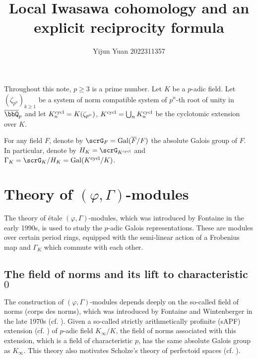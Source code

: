 \documentclass[a4paper,oneside]{amsart}
\title{Local Iwasawa cohomology and an explicit reciprocity formula}
\author{Yijun Yuan\textsuperscript{\orcidlink{0000-0001-6571-6980}} 2022311357}
\numberwithin{equation}{section}
\numberwithin{figure}{section}
\begin{document}
\maketitle
\tableofcontents
Throughout this note, $p\geq 3$ is a prime number. Let $K$ be a $p$-adic field. Let $(\zeta_{p^n})_{k\geq 1}$ be a system of norm compatible system of $p^n$-th root of unity in $\overline{\bbQ}_p$ and let $K_n^{\operatorname{cycl}}=K(\zeta_{p^n})$, $K^{\operatorname{cycl}}=\bigcup_n K_n^{\operatorname{cycl}}$ be the cyclotomic extension over $K$.

For any field $F$, denote by $\scrG_F=\opn{Gal}(\overline{F}/F)$ the absolute Galois group of $F$. In particular, denote by $H_K=\scrG_{K^{\opn{cycl}}}$ and $\Gamma_K=\scrG_K/H_K=\opn{Gal}(K^{\opn{cycl}}/K)$.
\section{Theory of $(\varphi,\Gamma)$-modules}
The theory of \'etale $(\varphi,\Gamma)$-modules, which was introduced by Fontaine in the early 1990s, is used to study the $p$-adic Galois representations. These are modules over certain period rings, equipped with the semi-linear action of a Frobenius map and $\Gamma_K$ which commute with each other.

\subsection{The field of norms and its lift to characteristic $0$}
The construction of $(\varphi,\Gamma)$-modules depends deeply on the so-called field of norms (corps des norms), which was introduced by Fontaine and Wintenberger in the late 1970s (cf. \cite{fontaine_extensions_1979,fontaine_corps_1979,wintenberger_corps_1983}). Given a so-called strictly arithmetically profinite (sAPF) extension (cf. \cite[D\'efinitions 1.2.1]{wintenberger_corps_1983}) of $p$-adic field $K_\infty/K$, the field of norms associated with this extension, which is a field of characteristic $p$, has the same absolute Galois group as $K_\infty$. This theory also motivates Scholze's theory of perfectoid spaces (cf. \cite[Theorem 1.1]{scholze_perfectoid_2012}).
\end{document}
